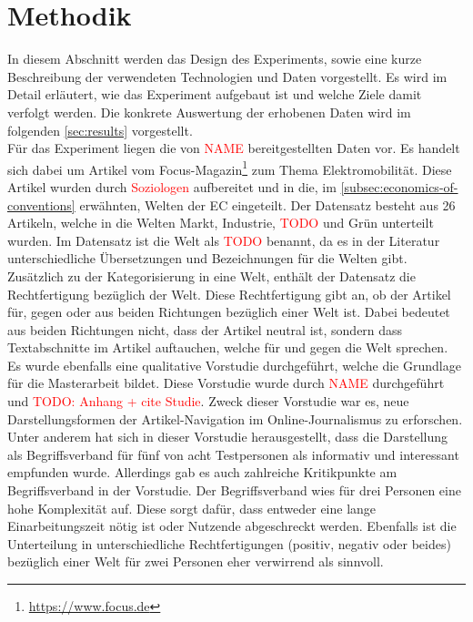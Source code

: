 \section{Methodik}
In diesem Abschnitt werden das Design des Experiments, sowie eine kurze Beschreibung der verwendeten Technologien und Daten vorgestellt.
Es wird im Detail erläutert, wie das Experiment aufgebaut ist und welche Ziele damit verfolgt werden.
Die konkrete Auswertung der erhobenen Daten wird im folgenden \autoref{sec:results} vorgestellt.\\

Für das Experiment liegen die von \textcolor{red}{NAME} bereitgestellten Daten vor.
Es handelt sich dabei um Artikel vom Focus-Magazin\footnote{\url{https://www.focus.de}} zum Thema Elektromobilität.
Diese Artikel wurden durch \textcolor{red}{Soziologen} aufbereitet und in die, im \autoref{subsec:economics-of-conventions} erwähnten, Welten der \ac{EC} eingeteilt.
Der Datensatz besteht aus 26 Artikeln, welche in die Welten Markt, Industrie, \textcolor{red}{TODO} und Grün unterteilt wurden.
Im Datensatz ist die Welt als \textcolor{red}{TODO} benannt, da es in der Literatur unterschiedliche Übersetzungen und Bezeichnungen für die Welten gibt.
Zusätzlich zu der Kategorisierung in eine Welt, enthält der Datensatz die Rechtfertigung bezüglich der Welt.
Diese Rechtfertigung gibt an, ob der Artikel für, gegen oder aus beiden Richtungen bezüglich einer Welt ist.
Dabei bedeutet aus beiden Richtungen nicht, dass der Artikel neutral ist, sondern dass Textabschnitte im Artikel auftauchen, welche für und gegen die Welt sprechen.\\

Es wurde ebenfalls eine qualitative Vorstudie durchgeführt, welche die Grundlage für die Masterarbeit bildet.
Diese Vorstudie wurde durch \textcolor{red}{NAME} durchgeführt und \textcolor{red}{TODO: Anhang + cite Studie}.
Zweck dieser Vorstudie war es, neue Darstellungsformen der Artikel-Navigation im Online-Journalismus zu erforschen.
Unter anderem hat sich in dieser Vorstudie herausgestellt, dass die Darstellung als Begriffsverband für fünf von acht Testpersonen als informativ und interessant empfunden wurde.
Allerdings gab es auch zahlreiche Kritikpunkte am Begriffsverband in der Vorstudie.
Der Begriffsverband wies für drei Personen eine hohe Komplexität auf.
Diese sorgt dafür, dass entweder eine lange Einarbeitungszeit nötig ist oder Nutzende abgeschreckt werden.
Ebenfalls ist die Unterteilung in unterschiedliche Rechtfertigungen (positiv, negativ oder beides) bezüglich einer Welt für zwei Personen eher verwirrend als sinnvoll.\\

